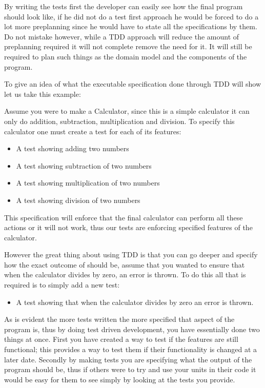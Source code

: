 By writing the tests first the developer can easily see how the final
program should look like, if he did not do a test first approach he
would be forced to do a lot more preplanning since he would have to
state all the specifications by them. Do not mistake however, while
a TDD approach will reduce the amount of preplanning required it will
not complete remove the need for it. It will still be required to
plan such things as the domain model and the components of the program. 

To give an idea of what the executable specification done through
TDD will show let us take this example:

Assume you were to make a Calculator, since this is a simple calculator
it can only do addition, subtraction, multiplication and division.
To specify this calculator one must create a test for each of its
features:
\begin{itemize}
\item A test showing adding two numbers 
\item A test showing subtraction of two numbers 
\item A test showing multiplication of two numbers 
\item A test showing division of two numbers
\end{itemize}
This specification will enforce that the final calculator can perform
all these actions or it will not work, thus our tests are enforcing
specified features of the calculator.

However the great thing about using TDD is that you can go deeper
and specify how the exact outcome of should be, assume that you wanted
to ensure that when the calculator divides by zero, an error is thrown.
To do this all that is required is to simply add a new test:
\begin{itemize}
\item A test showing that when the calculator divides by zero an error is
thrown.
\end{itemize}
As is evident the more tests written the more specified that aspect
of the program is, thus by doing test driven development, you have
essentially done two things at once. First you have created a way
to test if the features are still functional; this provides a way
to test them if their functionality is changed at a later date. Secondly
by making tests you are specifying what the output of the program
should be, thus if others were to try and use your units in their
code it would be easy for them to see simply by looking at the tests
you provide.


